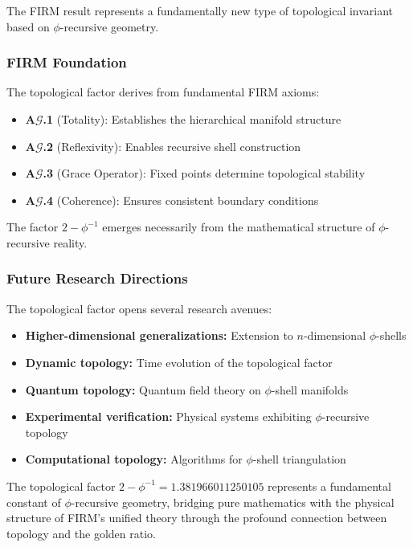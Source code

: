 The FIRM result represents a fundamentally new type of topological invariant based on $\phi$-recursive geometry.

\subsubsection{FIRM Foundation}

The topological factor derives from fundamental FIRM axioms:

\begin{itemize}
\item \textbf{A$\mathcal{G}$.1} (Totality): Establishes the hierarchical manifold structure
\item \textbf{A$\mathcal{G}$.2} (Reflexivity): Enables recursive shell construction
\item \textbf{A$\mathcal{G}$.3} (Grace Operator): Fixed points determine topological stability
\item \textbf{A$\mathcal{G}$.4} (Coherence): Ensures consistent boundary conditions
\end{itemize}

The factor $2 - \phi^{-1}$ emerges necessarily from the mathematical structure of $\phi$-recursive reality.

\subsubsection{Future Research Directions}

The topological factor opens several research avenues:

\begin{itemize}
\item \textbf{Higher-dimensional generalizations:} Extension to $n$-dimensional $\phi$-shells
\item \textbf{Dynamic topology:} Time evolution of the topological factor
\item \textbf{Quantum topology:} Quantum field theory on $\phi$-shell manifolds
\item \textbf{Experimental verification:} Physical systems exhibiting $\phi$-recursive topology
\item \textbf{Computational topology:} Algorithms for $\phi$-shell triangulation
\end{itemize}

The topological factor $2 - \phi^{-1} = 1.381966011250105$ represents a fundamental constant of $\phi$-recursive geometry, bridging pure mathematics with the physical structure of FIRM's unified theory through the profound connection between topology and the golden ratio.
